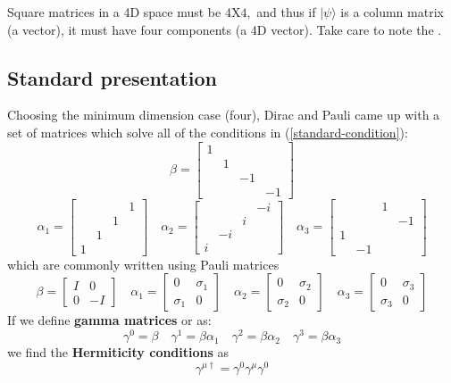 Square matrices in a 4D space must be  $4\mathrm{X} 4,$ and thus if $|\psi\rangle$ is a column matrix (a vector), it must have four components (a 4D vector). Take care to note the .
\subsection{Standard presentation}
Choosing the minimum dimension case (four), Dirac and Pauli came up with a set of matrices which solve all of the conditions in (\ref{standard-condition}):
$$
\beta=\left[\begin{array}{cccc}
{1} \\
{} & {1} \\
{} & {} & {-1} \\
{} & {} & {} & {-1}
\end{array}\right]
$$
$$
\alpha_{1}=\left[\begin{array}{cccc}
{}&{}&{}&{1} \\
{}&{}&{1} \\
{} & {1} \\
{1}
\end{array}\right] \quad \alpha_{2}=\left[\begin{array}{cccc}
{}&{}&{}&{-i} \\
{}&{}&{i} \\
{} & {-i} \\
{i}
\end{array}\right] \quad \alpha_{3}=\left[\begin{array}{cccc}
{}&{}&{1} \\
{}&{}&{}& {-1} \\
{1}\\
{}&{-1} 
\end{array}\right]
$$
which are commonly written using Pauli matrices
$$
\beta=\left[\begin{array}{cc}
{I} & {0} \\
{0} & {-I}
\end{array}\right] \quad \alpha_{1}=\left[\begin{array}{cc}
{0} & {\sigma_{1}} \\
{\sigma_{1}} & {0}
\end{array}\right] \quad \alpha_{2}=\left[\begin{array}{cc}
{0} & {\sigma_{2}} \\
{\sigma_{2}} & {0}
\end{array}\right] \quad \alpha_{3}=\left[\begin{array}{cc}
{0} & {\sigma_{3}} \\
{\sigma_{3}} & {0}
\end{array}\right]
$$
If we define \textbf{gamma matrices} or  as:
\begin{equation}
\gamma^{0}=\beta \quad \gamma^{1}=\beta \alpha_{1} \quad \gamma^{2}=\beta \alpha_{2} \quad \gamma^{3}=\beta \alpha_{3}
\end{equation}
we find the \textbf{Hermiticity conditions} as
\begin{equation}
\gamma^{\mu \dagger}=\gamma^{0} \gamma^{\mu} \gamma^{0}
\end{equation}
